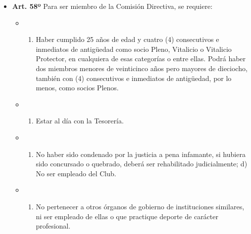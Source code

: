 \documentclass[]{book}
\providecommand{\tightlist}{%
  \setlength{\itemsep}{0pt}\setlength{\parskip}{0pt}}
\begin{document}
\begin{itemize}
\tightlist
\item
  \textbf{Art. 58º} Para ser miembro de la Comisión Directiva, se
  requiere:

  \begin{itemize}
  \item
    \begin{enumerate}
    \def\labelenumi{\alph{enumi})}
    \tightlist
    \item
      Haber cumplido 25 años de edad y cuatro (4) consecutivos e
      inmediatos de antigüedad como socio Pleno, Vitalicio o Vitalicio
      Protector, en cualquiera de esas categorías o entre ellas. Podrá
      haber dos miembros menores de veinticinco años pero mayores de
      dieciocho, también con (4) consecutivos e inmediatos de
      antigüedad, por lo menos, como socios Plenos.
    \end{enumerate}
  \item
    \begin{enumerate}
    \def\labelenumi{\alph{enumi})}
    \setcounter{enumi}{1}
    \tightlist
    \item
      Estar al día con la Tesorería.
    \end{enumerate}
  \item
    \begin{enumerate}
    \def\labelenumi{\alph{enumi})}
    \setcounter{enumi}{2}
    \tightlist
    \item
      No haber sido condenado por la justicia a pena infamante, si
      hubiera sido concursado o quebrado, deberá ser rehabilitado
      judicialmente; d) No ser empleado del Club.
    \end{enumerate}
  \item
    \begin{enumerate}
    \def\labelenumi{\alph{enumi})}
    \setcounter{enumi}{3}
    \tightlist
    \item
      No pertenecer a otros órganos de gobierno de instituciones
      similares, ni ser empleado de ellas o que practique deporte de
      carácter profesional.
    \end{enumerate}
  \end{itemize}
\end{itemize}
\end{document}
